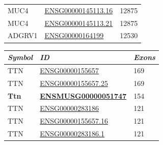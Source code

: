 \documentclass[12pt]{article}
\begin{document}
\begin{figure}[htbp]
\begin{minipage}{0.45\textwidth}
\begin{tabular}{l|l|l}
			MUC4                     & \href{https://asia.ensembl.org/Homo_sapiens/Gene/Summary?db=core;g=ENSG00000145113;r=3:195746765-195811973}{ENSG00000145113.16}           & 12875                   \\
			MUC4                     & \href{https://asia.ensembl.org/Homo_sapiens/Gene/Summary?db=core;g=ENSG00000145113;r=3:195746765-195811973}{ENSG00000145113.21}           & 12875                   \\
			ADGRV1                   & \href{https://asia.ensembl.org/Homo_sapiens/Gene/Summary?db=core;g=ENSG00000164199;r=5:90529344-91164437}{ENSG00000164199}                & 12530                   \\
		\end{tabular}
	\end{minipage}%
	\hfill
	\begin{minipage}{0.45\textwidth}
		\centering
        \begin{tabular}{l|l|l}
			\textit{\textbf{Symbol}} & \textit{\textbf{ID}}                                                                                                                      & \textit{\textbf{Exons}} \\\hline
			TTN                      & \href{https://asia.ensembl.org/Homo_sapiens/Gene/Summary?db=core;g=ENSG00000155657;r=2:178525989-178830802}{ENSG00000155657}              & 169                     \\
			TTN                      & \href{https://asia.ensembl.org/Homo_sapiens/Gene/Summary?db=core;g=ENSG00000155657;r=2:178525989-178830802}{ENSG00000155657.25}           & 169                     \\
			\textbf{Ttn}                      & \href{https://asia.ensembl.org/Mus_musculus/Gene/Summary?db=core;g=ENSMUSG00000051747;r=2:76534324-76812891}{\textbf{ENSMUSG00000051747}} & 154                     \\
			TTN                      & \href{https://asia.ensembl.org/Homo_sapiens/Gene/Idhistory?g=ENSG00000283186}{ENSG00000283186}                                            & 121                     \\
			TTN                      & \href{https://asia.ensembl.org/Homo_sapiens/Gene/Summary?db=core;g=ENSG00000155657;r=2:178525989-178830802}{ENSG00000155657.16}           & 121                     \\
			TTN                      & \href{https://asia.ensembl.org/Homo_sapiens/Gene/Idhistory?g=ENSG00000283186}{ENSG00000283186.1}                                          & 121                     \\

\end{tabular}
\end{minipage}
\end{figure}
\end{document}
